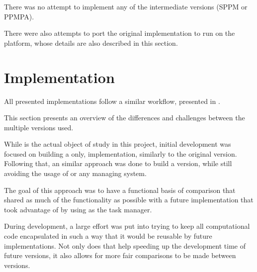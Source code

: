 \documentclass[main.tex]{subfiles}
\begin{document}
There was no attempt to implement any of the intermediate versions (SPPM or PPMPA).

There were also attempts to port the original implementation to run on the \mic platform, whose details are also described in this section.




\section{Implementation}

All presented implementations follow a similar workflow, presented in .

This section presents an overview of the differences and challenges between the multiple versions used.

While \starpu is the actual object of study in this project, initial development was focused on building a \cpu only, implementation, similarly to the original version. Following that, an similar approach was done to build a \cuda version, while still avoiding the usage of \starpu or any \hetplat managing system.

The goal of this approach was to have a functional basis of comparison that shared as much of the functionality as possible with a future implementation that took advantage of \hetplats by using \starpu as the task manager.

During development, a large effort was put into trying to keep all computational code encapsulated in such a way that it would be reusable by future implementations. Not only does that help speeding up the development time of future versions, it also allows for more fair comparisons to be made between versions.






\end{document}
